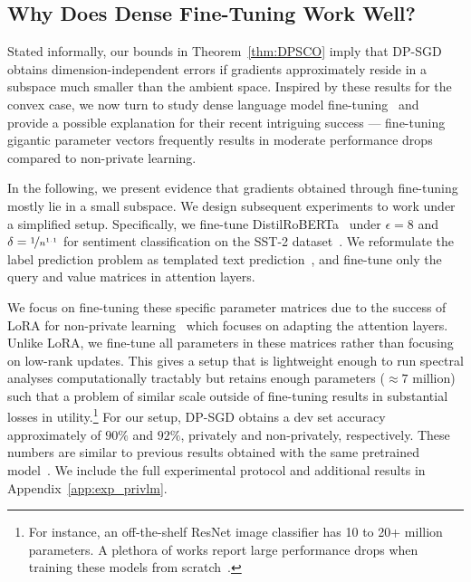 \subsection{Why Does Dense Fine-Tuning Work Well?}\label{sec:lm}
Stated informally, our bounds in Theorem~\ref{thm:DPSCO} imply that DP-SGD obtains dimension-independent errors if gradients approximately reside in a subspace much smaller than the ambient space.
Inspired by these results for the convex case, we now turn to study dense language model fine-tuning~\citep{li2021large} and provide a possible explanation for their recent intriguing success --- fine-tuning gigantic parameter vectors frequently results in moderate performance drops compared to non-private learning.


In the following, we present evidence that gradients obtained through fine-tuning mostly lie in a small subspace.
We design subsequent experiments to work under a simplified setup. 
Specifically, we fine-tune DistilRoBERTa~\citep{sanh2019distilbert,liu2019roberta} under $\epsilon=8$ and $\delta = \nicefrac{1}{n^{1.1}}$ for sentiment classification on the SST-2 dataset~\citep{socher2013recursive}.
We reformulate the label prediction problem as templated text prediction~\citep{li2021large}, and fine-tune only the query and value matrices in attention layers.

We focus on fine-tuning these specific parameter matrices due to the success of LoRA for non-private learning~\citep{hu2021lora} which focuses on adapting the attention layers. Unlike LoRA, we fine-tune all parameters in these matrices rather than focusing on low-rank updates.
This gives a setup that is lightweight enough to run spectral analyses computationally tractably but retains enough parameters ($\approx7$ million) such that a problem of similar scale outside of fine-tuning results in substantial losses in utility.\footnote{For instance, an off-the-shelf ResNet image classifier has 10 to 20+ million parameters. A plethora of works report large performance drops when training these models from scratch~\citep{YZCL21,luo2021scalable,de2022unlocking}.}
For our setup, DP-SGD obtains a dev set accuracy approximately of $90\%$ and $92\%$, privately and non-privately, respectively.
These numbers are similar to previous results obtained with the same pretrained model~\citep{yu2021differentially,li2021large}. 
We include the full experimental protocol and additional results in Appendix~\ref{app:exp_privlm}.

